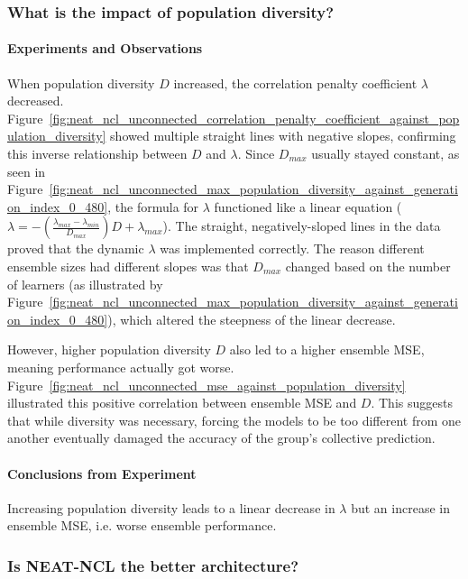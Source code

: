\documentclass{article}
\begin{document}
\subsubsection{What is the impact of population diversity? }
\paragraph{Experiments and Observations}
When population diversity $D$ increased, the correlation penalty coefficient $\lambda$ decreased. Figure~\ref{fig:neat_ncl_unconnected_correlation_penalty_coefficient_against_population_diversity} showed multiple straight lines with negative slopes, confirming this inverse relationship between $D$ and $\lambda$. Since $D_{max}$ usually stayed constant, as seen in Figure~\ref{fig:neat_ncl_unconnected_max_population_diversity_against_generation_index_0_480}, the formula for $\lambda$ functioned like a linear equation ($\lambda = -(\frac{\lambda_{max} - \lambda_{min}}{D_{max}})D + \lambda_{max}$). The straight, negatively-sloped lines in the data proved that the dynamic $\lambda$ was implemented correctly. The reason different ensemble sizes had different slopes was that $D_{max}$ changed based on the number of learners (as illustrated by Figure~\ref{fig:neat_ncl_unconnected_max_population_diversity_against_generation_index_0_480}), which altered the steepness of the linear decrease. 

However, higher population diversity $D$ also led to a higher ensemble MSE, meaning performance actually got worse. Figure~\ref{fig:neat_ncl_unconnected_mse_against_population_diversity} illustrated this positive correlation between ensemble MSE and $D$. This suggests that while diversity was necessary, forcing the models to be too different from one another eventually damaged the accuracy of the group's collective prediction. 

\paragraph{Conclusions from Experiment}
Increasing population diversity leads to a linear decrease in $\lambda$ but an increase in ensemble MSE, i.e. worse ensemble performance. 


\subsubsection{Is NEAT-NCL the better architecture? }
\end{document}
